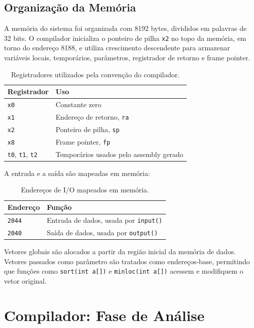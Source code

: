 \documentclass[12pt,a4paper]{report}
\begin{document}
\section{Organização da Memória}

A memória do sistema foi organizada com 8192 bytes, divididos em palavras de 32 bits. O compilador inicializa o ponteiro de pilha \texttt{x2} no topo da memória, em torno do endereço 8188, e utiliza crescimento descendente para armazenar variáveis locais, temporários, parâmetros, registrador de retorno e frame pointer.

\begin{table}[H]
\centering
\begin{tabular}{ll}
\toprule
Registrador & Uso \\
\midrule
\texttt{x0} & Constante zero \\
\texttt{x1} & Endereço de retorno, \texttt{ra} \\
\texttt{x2} & Ponteiro de pilha, \texttt{sp} \\
\texttt{x8} & Frame pointer, \texttt{fp} \\
\texttt{t0}, \texttt{t1}, \texttt{t2} & Temporários usados pelo assembly gerado \\
\bottomrule
\end{tabular}
\caption{Registradores utilizados pela convenção do compilador.}
\end{table}

A entrada e a saída são mapeadas em memória:

\begin{table}[H]
\centering
\begin{tabular}{ll}
\toprule
Endereço & Função \\
\midrule
\texttt{2044} & Entrada de dados, usada por \texttt{input()} \\
\texttt{2040} & Saída de dados, usada por \texttt{output()} \\
\bottomrule
\end{tabular}
\caption{Endereços de I/O mapeados em memória.}
\end{table}

Vetores globais são alocados a partir da região inicial da memória de dados. Vetores passados como parâmetro são tratados como endereços-base, permitindo que funções como \texttt{sort(int a[])} e \texttt{minloc(int a[])} acessem e modifiquem o vetor original.

\chapter{Compilador: Fase de Análise}
\end{document}
